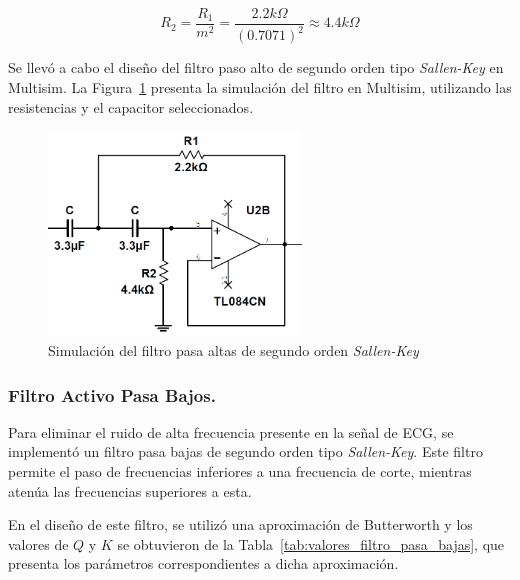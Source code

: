         \begin{equation}
            \label{eq:resistencia_R2_pasa_altos}
            R_2 = \frac{R_1}{m^2} = \frac{2.2 k\Omega}{(0.7071)^2} \approx 4.4 k\Omega 
        \end{equation}

        Se llevó a cabo el diseño del filtro paso alto de segundo orden tipo \textit{Sallen-Key} en Multisim. La Figura~\ref{fig:Simulacion_Filtro_Pasa_Altas} presenta la simulación del filtro en Multisim, utilizando las resistencias y el capacitor seleccionados.

        \begin{figure}[H]
            \centering
            \includegraphics[width=0.6\textwidth]{img/Desarrollo/multisim_pasaAltos.png}
            \caption[Simulación del filtro pasa altas de segundo orden \textit{Sallen-Key}.]{Simulación del filtro pasa altas de segundo orden \textit{Sallen-Key}\footnotemark}
            \label{fig:Simulacion_Filtro_Pasa_Altas}
        \end{figure}

        \subsubsection{Filtro Activo Pasa Bajos.}
        Para eliminar el ruido de alta frecuencia presente en la señal de ECG, se implementó un filtro pasa bajas de segundo orden tipo \textit{Sallen-Key}. Este filtro permite el paso de frecuencias inferiores a una frecuencia de corte, mientras atenúa las frecuencias superiores a esta.

        En el diseño de este filtro, se utilizó una aproximación de Butterworth y los valores de $Q$ y $K$ se obtuvieron de la Tabla~\ref{tab:valores_filtro_pasa_bajas}, que presenta los parámetros correspondientes a dicha aproximación.

